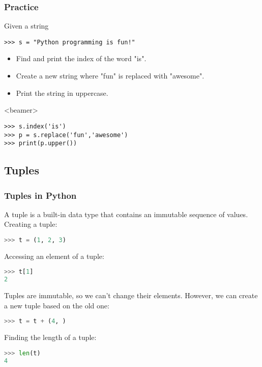 \begin{frame}[fragile,label=practice_strings]
  \frametitle{Practice}
  Given a string
  \begin{lstlisting}
>>> s = "Python programming is fun!"
  \end{lstlisting}
  \begin{itemize}
   \item Find and print the index of the word "is".
   \item Create a new string where "fun" is replaced with "awesome".
   \item Print the string in uppercase.
  \end{itemize}
  \begin{onlyenv}<beamer>
    \begin{lstlisting}[]
>>> s.index('is')
>>> p = s.replace('fun','awesome')
>>> print(p.upper())
    \end{lstlisting}
  \end{onlyenv}
 \end{frame}

\subsection{Tuples}
\begin{frame}[fragile]
  \frametitle{Tuples in Python}
  A tuple is a built-in data type that contains an immutable sequence of values. 
  Creating a tuple:
  \begin{lstlisting}[language=Python,numbers=none]
>>> t = (1, 2, 3)
  \end{lstlisting}
  Accessing an element of a tuple:
  \begin{lstlisting}[language=Python,numbers=none]
>>> t[1]
2
  \end{lstlisting}
  Tuples are immutable, so we can't change their elements. However, we can create a new tuple based on the old one:
  \begin{lstlisting}[language=Python,numbers=none]
>>> t = t + (4, )
  \end{lstlisting}
  Finding the length of a tuple:
  \begin{lstlisting}[language=Python,numbers=none]
>>> len(t)
4
  \end{lstlisting}
\end{frame}


